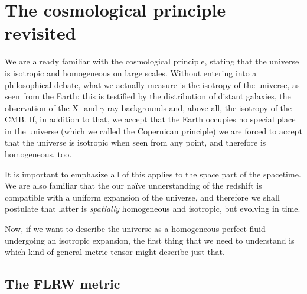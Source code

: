\section{The cosmological principle revisited}

We are already familiar with the cosmological principle, stating that the universe
is isotropic and homogeneous on large scales. Without entering into a philosophical
debate, what we actually measure is the isotropy of the universe, as seen from the
Earth: this is testified by the distribution of distant galaxies, the observation of the
X- and $\gamma$-ray backgrounds and, above all, the isotropy of the CMB. If, in
addition to that, we accept that the Earth occupies no special place in the universe
(which we called the Copernican principle) we are forced to accept that the universe
is isotropic when seen from any point, and therefore is homogeneous, too.

It is important to emphasize all of this applies to the space part of the spacetime.
We are also familiar that the our na\"ive understanding of the redshift is compatible
with a uniform expansion of the universe, and therefore we shall postulate that latter
is \emph{spatially} homogeneous and isotropic, but evolving in time.

Now, if we want to describe the universe as a homogeneous perfect fluid undergoing an
isotropic expansion, the first thing that we need to understand is which kind of
general metric tensor might describe just that.



\subsection{The FLRW metric}

